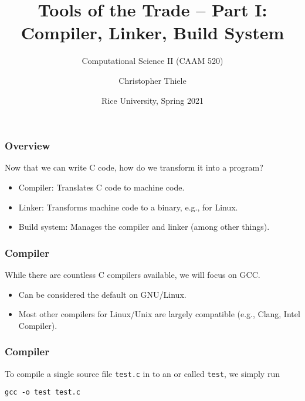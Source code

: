 \documentclass[12pt,t]{beamer}
\let\emph\relax %
\newcommand{\cmd}[1]{\begin{center}\texttt{#1}\end{center}}
\begin{document}
  \title{Tools of the Trade -- Part I:\\Compiler, Linker, Build System}
  \subtitle{Computational Science II (CAAM 520)}
  \author{Christopher Thiele}
  \date{Rice University, Spring 2021}

  \begin{frame}
    \titlepage
  \end{frame}


  \begin{frame}[fragile]
    \frametitle{Overview}

    Now that we can write C code, how do we transform it into a program?
    \begin{itemize}
      \item Compiler: Translates C code to machine code.
      \item Linker: Transforms machine code to a binary, e.g., for Linux.
      \item Build system: Manages the compiler and linker (among other things).
    \end{itemize}
  \end{frame}

  \begin{frame}[fragile]
    \frametitle{Compiler}

    While there are countless C compilers available, we will focus on GCC.
    \begin{itemize}
      \item Can be considered the default on GNU/Linux.
      \item Most other compilers for Linux/Unix are largely compatible (e.g., Clang, Intel Compiler).
    \end{itemize}
  \end{frame}

  \begin{frame}[fragile]
    \frametitle{Compiler}

    To compile a single source file \texttt{test.c} in to an \emph{executable} or \emph{binary} called \texttt{test}, we simply run
    \cmd{gcc -o test test.c}
  \end{frame}
\end{document}
